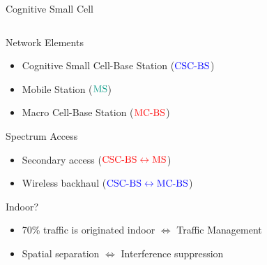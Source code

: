 \documentclass[16pt]{beamer}
\newcommand{\fs}[2]{\fontsize{#1 pt}{#2}\selectfont}
\begin{document}
\begin{frame}[t]{Cognitive Small Cell}
		\vspace{-0.1cm}
		\fs{8}{8}
	\begin{columns}
	\begin{column}{0.37\columnwidth}
		\vspace{-0.1cm}
		\onslide<2->
		{	
			\begin{block}{\footnotesize Network Elements}
				\begin{itemize}
					\item Cognitive Small Cell-Base Station ($\color{blue}{\text{CSC-BS}}$)
					\item Mobile Station ($\color{kit-green100}{\text{MS}}$) 
					\item Macro Cell-Base Station ($\color{red}{\text{MC-BS}}$) 
				\end{itemize}
			\end{block}
		}
		{
			\begin{block}{\footnotesize Spectrum Access}
				\begin{itemize}
					\item Secondary access ($\color{red}{\text{CSC-BS} \leftrightarrow \text{MS}}$) 
					\item Wireless backhaul ($\color{blue}{\text{CSC-BS} \leftrightarrow \text{MC-BS}}$)
				\end{itemize}
			\end{block}
		}
		{
			\begin{block}{\footnotesize Indoor?}
				\begin{itemize}
					\item 70\% traffic is originated indoor $\Leftrightarrow$ Traffic Management
					\item Spatial separation $\Leftrightarrow$ Interference suppression	
				\end{itemize}
			\end{block}
		}
	\end{column}
	\begin{column}{0.63\columnwidth}
		\fs{8}{8}
		\begin{center}

\end{center}
\end{column}
\end{columns}
\end{frame}
\end{document}
